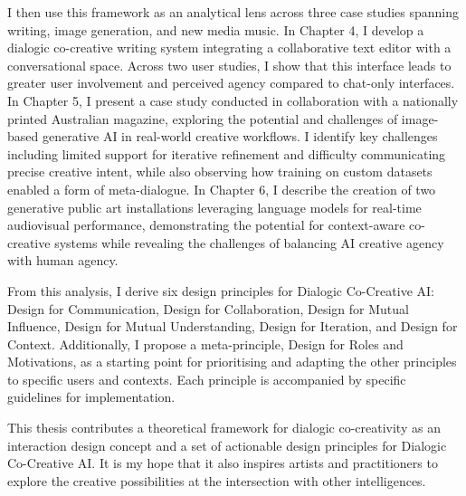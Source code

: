I then use this framework as an analytical lens across three case studies spanning writing, image generation, and new media music. In Chapter 4, I develop a dialogic co-creative writing system integrating a collaborative text editor with a conversational space. Across two user studies, I show that this interface leads to greater user involvement and perceived agency compared to chat-only interfaces. In Chapter 5, I present a case study conducted in collaboration with a nationally printed Australian magazine, exploring the potential and challenges of image-based generative AI in real-world creative workflows. I identify key challenges including limited support for iterative refinement and difficulty communicating precise creative intent, while also observing how training on custom datasets enabled a form of meta-dialogue. In Chapter 6, I describe the creation of two generative public art installations leveraging language models for real-time audiovisual performance, demonstrating the potential for context-aware co-creative systems while revealing the challenges of balancing AI creative agency with human agency.

From this analysis, I derive six design principles for Dialogic Co-Creative AI: Design for Communication, Design for Collaboration, Design for Mutual Influence, Design for Mutual Understanding, Design for Iteration, and Design for Context. Additionally, I propose a meta-principle, Design for Roles and Motivations, as a starting point for prioritising and adapting the other principles to specific users and contexts. Each principle is accompanied by specific guidelines for implementation.

This thesis contributes a theoretical framework for dialogic co-creativity as an interaction design concept and a set of actionable design principles for Dialogic Co-Creative AI. It is my hope that it also inspires artists and practitioners to explore the creative possibilities at the intersection with other intelligences.